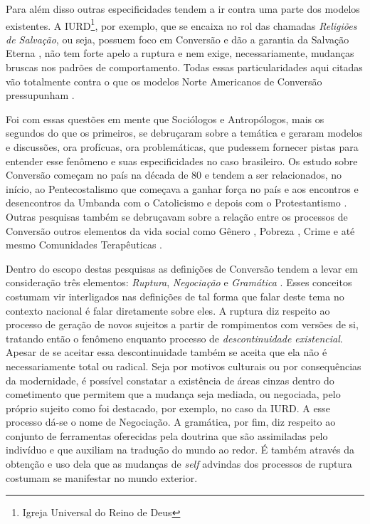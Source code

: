 \documentclass[
	12pt,				%
	oneside,			%
	a4paper,			%
	sumario=tradicional,
	english,			%
	brazil				%
	]{abntex2}
\begin{document}
Para além disso outras especificidades tendem a ir contra uma parte dos modelos existentes. A IURD\footnote{Igreja Universal do Reino de Deus}, por exemplo, que se encaixa no rol das chamadas \emph{Religiões de Salvação}, ou seja, possuem foco em Conversão e dão a garantia da Salvação Eterna \autocite[121]{pierucci_religiao_2006}, não tem forte apelo a ruptura e nem exige, necessariamente, mudanças bruscas nos padrões de comportamento. Todas essas particularidades aqui citadas vão totalmente contra o que os modelos Norte Americanos de Conversão pressupunham \autocite{mafra_na_2018}.

Foi com essas questões em mente que Sociólogos e Antropólogos, mais os segundos do que os primeiros, se debruçaram sobre a temática e geraram modelos e discussões, ora profícuas, ora problemáticas, que pudessem fornecer pistas para entender esse fenômeno e suas especificidades no caso brasileiro. Os estudo sobre Conversão começam no país na década de 80 e tendem a ser relacionados, no início, ao Pentecostalismo que começava a ganhar força no país \autocites[156]{prandi_converting_2008}[10]{lamb_religious_1999} e aos encontros e desencontros da Umbanda com o Catolicismo \autocite{birman_cultos_1996} e depois com o Protestantismo \autocite{mafra_o_2002}. Outras pesquisas também se debruçavam sobre a relação entre os processos de Conversão outros elementos da vida social como Gênero \autocite{machado_conversao_1998}, Pobreza \autocite{mariz_religiao_1991}, Crime \autocite{cunha_traficantes_2008} e até mesmo Comunidades Terapêuticas \autocite{targino_experiencias_2020}.

Dentro do escopo destas pesquisas as definições de Conversão tendem a levar em consideração três elementos: \emph{Ruptura}, \emph{Negociação} e \emph{Gramática} \autocite{teixeira_processos_2021}. Esses conceitos costumam vir interligados nas definições de tal forma que falar deste tema no contexto nacional é falar diretamente sobre eles. A ruptura diz respeito ao processo de geração de novos sujeitos a partir de rompimentos com versões de si, tratando então o fenômeno enquanto processo de \emph{descontinuidade existencial}. Apesar de se aceitar essa descontinuidade também se aceita que ela não é necessariamente total ou radical. Seja por motivos culturais ou por consequências da modernidade, é possível constatar a existência de áreas cinzas dentro do cometimento que permitem que a mudança seja mediada, ou negociada, pelo próprio sujeito como foi destacado, por exemplo, no caso da IURD. A esse processo dá-se o nome de Negociação. A gramática, por fim, diz respeito ao conjunto de ferramentas oferecidas pela doutrina que são assimiladas pelo indivíduo e que auxiliam na tradução do mundo ao redor. É também através da obtenção e uso dela que as mudanças de \emph{self} advindas dos processos de ruptura costumam se manifestar no mundo exterior.
\end{document}
